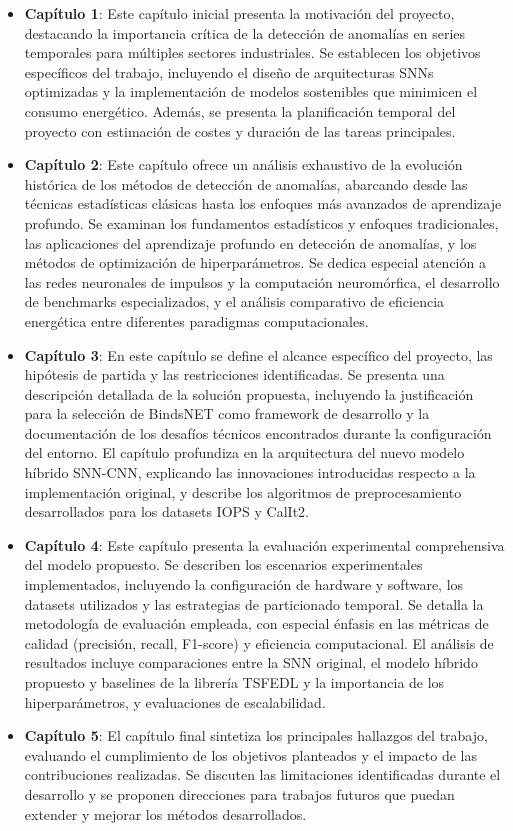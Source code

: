 \begin{itemize}
    \item\textbf{Capítulo 1}: Este capítulo inicial presenta la motivación del proyecto, destacando la importancia crítica de la detección de anomalías en series temporales para múltiples sectores industriales. Se establecen los objetivos específicos del trabajo, incluyendo el diseño de arquitecturas SNNs optimizadas y la implementación de modelos sostenibles que minimicen el consumo energético. Además, se presenta la planificación temporal del proyecto con estimación de costes y duración de las tareas principales.
    
    \item\textbf{Capítulo 2}: Este capítulo ofrece un análisis exhaustivo de la evolución histórica de los métodos de detección de anomalías, abarcando desde las técnicas estadísticas clásicas hasta los enfoques más avanzados de aprendizaje profundo. Se examinan los fundamentos estadísticos y enfoques tradicionales, las aplicaciones del aprendizaje profundo en detección de anomalías, y los métodos de optimización de hiperparámetros. Se dedica especial atención a las redes neuronales de impulsos y la computación neuromórfica, el desarrollo de benchmarks especializados, y el análisis comparativo de eficiencia energética entre diferentes paradigmas computacionales.
    
    \item\textbf{Capítulo 3}: En este capítulo se define el alcance específico del proyecto, las hipótesis de partida y las restricciones identificadas. Se presenta una descripción detallada de la solución propuesta, incluyendo la justificación para la selección de BindsNET como framework de desarrollo y la documentación de los desafíos técnicos encontrados durante la configuración del entorno. El capítulo profundiza en la arquitectura del nuevo modelo híbrido SNN-CNN, explicando las innovaciones introducidas respecto a la implementación original, y describe los algoritmos de preprocesamiento desarrollados para los datasets IOPS y CalIt2.
    
    \item\textbf{Capítulo 4}: Este capítulo presenta la evaluación experimental comprehensiva del modelo propuesto. Se describen los escenarios experimentales implementados, incluyendo la configuración de hardware y software, los datasets utilizados y las estrategias de particionado temporal. Se detalla la metodología de evaluación empleada, con especial énfasis en las métricas de calidad (precisión, recall, F1-score) y eficiencia computacional. El análisis de resultados incluye comparaciones entre la SNN original, el modelo híbrido propuesto y baselines de la librería TSFEDL y la importancia de los hiperparámetros, y evaluaciones de escalabilidad.
    
    \item\textbf{Capítulo 5}: El capítulo final sintetiza los principales hallazgos del trabajo, evaluando el cumplimiento de los objetivos planteados y el impacto de las contribuciones realizadas. Se discuten las limitaciones identificadas durante el desarrollo y se proponen direcciones para trabajos futuros que puedan extender y mejorar los métodos desarrollados.
\end{itemize}


